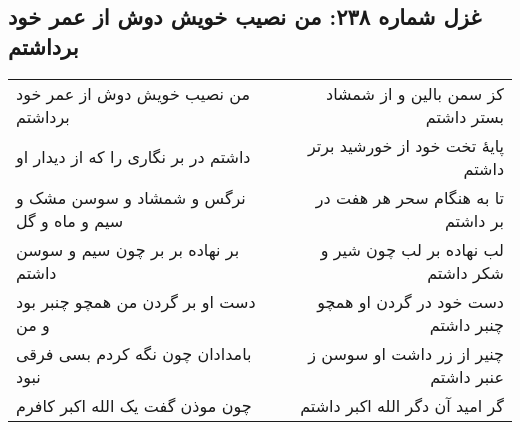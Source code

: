 \begin{center}
\section*{غزل شماره ۲۳۸: من نصیب خویش دوش از عمر خود برداشتم}
\label{sec:238}
\begin{longtable}{l p{0.5cm} r}
من نصیب خویش دوش از عمر خود برداشتم
&&
کز سمن بالین و از شمشاد بستر داشتم
\\
داشتم در بر نگاری را که از دیدار او
&&
پایهٔ تخت خود از خورشید برتر داشتم
\\
نرگس و شمشاد و سوسن مشک و سیم و ماه و گل
&&
تا به هنگام سحر هر هفت در بر داشتم
\\
بر نهاده بر بر چون سیم و سوسن داشتم
&&
لب نهاده بر لب چون شیر و شکر داشتم
\\
دست او بر گردن من همچو چنبر بود و من
&&
دست خود در گردن او همچو چنبر داشتم
\\
بامدادان چون نگه کردم بسی فرقی نبود
&&
چنیر از زر داشت او سوسن ز عنبر داشتم
\\
چون موذن گفت یک الله اکبر کافرم
&&
گر امید آن دگر الله اکبر داشتم
\\
\end{longtable}
\end{center}
